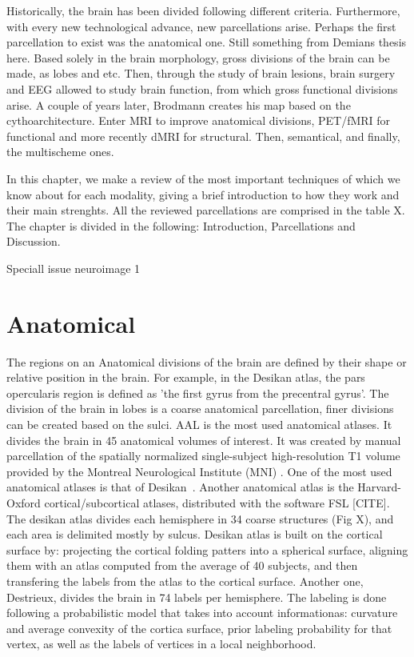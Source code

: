 Historically, the brain has been divided following different criteria. Furthermore,
with every new technological advance, new parcellations arise. Perhaps the first
parcellation to exist was the anatomical one. Still something from Demians thesis
here. Based solely in the brain morphology, gross divisions of the brain can be
made, as lobes and etc. Then, through the study of brain lesions, brain surgery
and EEG allowed to study brain function, from which gross functional divisions
arise. A couple of years later, Brodmann creates his map based on the
cythoarchitecture. Enter MRI to improve anatomical divisions, PET/fMRI for functional
and more recently dMRI for structural. Then, semantical, and finally, the
multischeme ones.

In this chapter, we make a review of the most important techniques of which
we know about for each modality, giving a brief introduction to how they work
and their main strenghts. All the reviewed parcellations are comprised in the
table X. The chapter is divided in the following: Introduction, Parcellations
and Discussion.

Speciall issue neuroimage \cite{The2018}1

\section{Anatomical}
The regions on an Anatomical divisions of the brain are defined by their shape
or relative position in the brain. For example, in the Desikan atlas, the
pars opercularis region is defined as 'the first gyrus from the precentral gyrus'.
The division of the brain in lobes is a coarse anatomical parcellation, finer
divisions can be created based on the sulci. AAL\cite{Landeau2002} is the most used anatomical
atlases. It divides the brain in 45 anatomical volumes of interest. It was
created by manual parcellation of the spatially normalized single-subject 
high-resolution T1 volume provided by the Montreal Neurological Institute (MNI) \cite{Collins1998}.
One of the most used anatomical atlases is that of Desikan~\cite{Desikan2006}.
Another anatomical atlas is the Harvard-Oxford cortical/subcortical atlases,
distributed with the software FSL [CITE].
The desikan atlas divides each hemisphere in 34 coarse structures (Fig X), and each
area is delimited mostly by sulcus. Desikan atlas is built on the cortical surface by: projecting the cortical folding
patters into a spherical surface, aligning them with an atlas computed from the
average of 40 subjects, and then transfering the labels from the atlas to the
cortical surface. Another one, Destrieux, divides the brain in 74 labels per
hemisphere. The labeling is done following a probabilistic model that takes
into account informationas: curvature and average convexity of the cortica
surface, prior labeling probability for that vertex, as well as the labels
of vertices in a local neighborhood.

